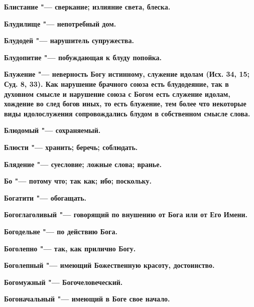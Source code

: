 \begin{multicols}{2}
\bfseries Блистание\normalfont{} "--- сверкание; излияние света, блеска. 




\bfseries Блудилище\normalfont{} "--- непотребный дом. 




\bfseries Блудодей\normalfont{} "--- нарушитель супружества. 




\bfseries Блудопитие\normalfont{} "--- побуждающая к блуду попойка. 




\bfseries Блужение\normalfont{} "--- неверность Богу истинному, служение идолам (Исх. 34, 15; Суд. 8, 33). Как нарушение брачного союза есть блудодеяние, так в духовном смысле и нарушение союза с Богом есть служение идолам, хождение во след богов иных, то есть блужение, тем более что некоторые виды идолослужения сопровождались блудом в собственном смысле слова. 




\bfseries Блюдомый\normalfont{} "--- сохраняемый. 




\bfseries Блюсти\normalfont{} "--- хранить; беречь; соблюдать. 




\bfseries Блядение\normalfont{} "--- суесловие; ложные слова; вранье. 




\bfseries Бо\normalfont{} "--- потому что; так как; ибо; поскольку. 




\bfseries Богатити\normalfont{} "--- обогащать. 




\bfseries Богоглаголивый\normalfont{} "--- говорящий по внушению от Бога или от Его Имени. 




\bfseries Богодельне\normalfont{} "--- по действию Бога. 




\bfseries Боголепно\normalfont{} "--- так, как прилично Богу. 




\bfseries Боголепный\normalfont{} "--- имеющий Божественную красоту, достоинство. 




\bfseries Богомужный\normalfont{} "--- Богочеловеческий. 




\bfseries Богоначальный\normalfont{} "--- имеющий в Боге свое начало. 





\end{multicols}
